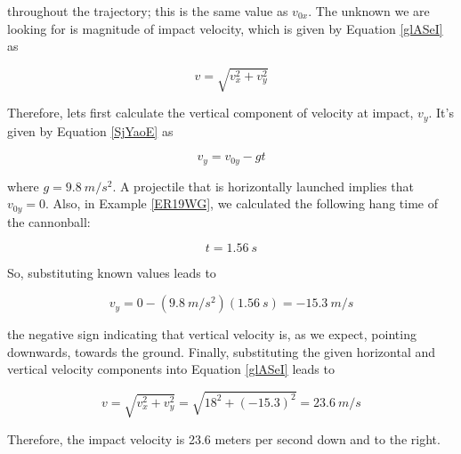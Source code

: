 \documentclass[main-physics.tex]{subfiles}
\begin{document}
throughout the trajectory; this is the same value as $v_{0x}$. The unknown we are looking for is magnitude of impact velocity, which is given by Equation \eqref{glASeI} as

\begin{equation*}
    v = \sqrt{v_x^2 + v_y^2}
\end{equation*}

Therefore, lets first calculate the vertical component of velocity at impact, $v_y$. It's given by Equation \eqref{SjYaoE} as

\begin{equation*}
    v_y = v_{0y} - gt
\end{equation*}

where $g = \SI{9.8}{m/s^2}$. A projectile that is horizontally launched implies that $v_{0y} = 0$. Also, in Example \ref{ER19WG}, we calculated the following hang time of the cannonball:

\begin{equation*}
    t = \SI{1.56}{s}
\end{equation*}

So, substituting known values leads to 

\begin{equation*}
    v_y = 0 - (\SI{9.8}{m/s^2})(\SI{1.56}{s}) = -\SI{15.3}{m/s} 
\end{equation*}

the negative sign indicating that vertical velocity is, as we expect, pointing downwards, towards the ground. Finally, substituting the given horizontal and vertical velocity components into Equation \eqref{glASeI} leads to

\begin{equation*}
    v = \sqrt{v_x^2 + v_y^2} = \sqrt{18^2 + \left(-15.3\right)^2} = \SI{23.6}{m/s}
\end{equation*}

Therefore, the impact velocity is 23.6 meters per second down and to the right.

\begin{center}
\end{center}
\end{document}
